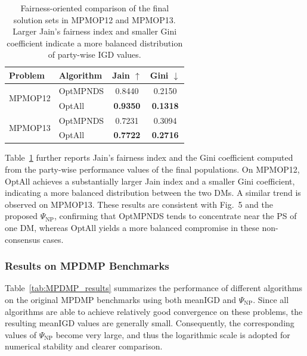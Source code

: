 \documentclass[journal]{IEEEtran}
\begin{document}
\begin{table}[!t]
	\centering
	\caption{Fairness-oriented comparison of the final solution sets in MPMOP12 and MPMOP13. Larger Jain's fairness index and smaller Gini coefficient indicate a more balanced distribution of party-wise IGD values.}
	\label{tab:jain_gini}
	\begin{tabular}{@{}l l c c@{}}
			\toprule
			\textbf{Problem} & \textbf{Algorithm} & \textbf{Jain} $\uparrow$ & \textbf{Gini} $\downarrow$ \\
			\midrule
			\multirow[c]{2}{*}{MPMOP12}
			& OptMPNDS & 0.8440 & 0.2150 \\
			& OptAll   & \cellcolor{lightgray}\textbf{0.9350} & \cellcolor{lightgray}\textbf{0.1318} \\
			\midrule
			\multirow[c]{2}{*}{MPMOP13}
			& OptMPNDS & 0.7231 & 0.3094 \\
			& OptAll   & \cellcolor{lightgray}\textbf{0.7722} & \cellcolor{lightgray}\textbf{0.2716} \\
			\bottomrule
	\end{tabular}
\end{table}

Table~\ref{tab:jain_gini} further reports Jain's fairness index and the Gini coefficient computed from the party-wise performance values of the final populations. On MPMOP12, OptAll achieves a substantially larger Jain index and a smaller Gini coefficient, indicating a more balanced distribution between the two DMs. A similar trend is observed on MPMOP13. These results are consistent with Fig.~5 and the proposed $\Psi_{\mathrm{NP}}$, confirming that OptMPNDS tends to concentrate near the PS of one DM, whereas OptAll yields a more balanced compromise in these non-consensus cases.

\subsubsection{Results on MPDMP Benchmarks}

Table~\ref{tab:MPDMP_results} summarizes the performance of different algorithms on the original MPDMP benchmarks using both meanIGD and $\Psi_{\mathrm{NP}}$. Since all algorithms are able to achieve relatively good convergence on these problems, the resulting meanIGD values are generally small. Consequently, the corresponding values of $\Psi_{\mathrm{NP}}$ become very large, and thus the logarithmic scale is adopted for numerical stability and clearer comparison.
\end{document}
